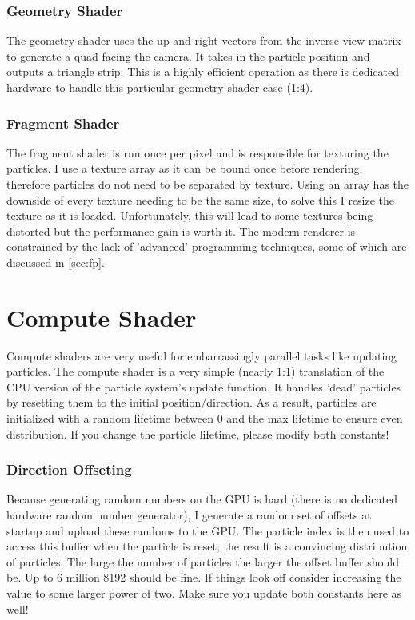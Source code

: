 \documentclass[]{report}
\begin{document}
\subsubsection{Geometry Shader}
The geometry shader uses the up and right vectors from the inverse view matrix to generate a quad facing the camera. It takes in the particle position and outputs a triangle strip. This is a highly efficient operation as there is dedicated hardware to handle this particular geometry shader case (1:4)\cite[p.~9]{amdprogram}. 
\subsubsection{Fragment Shader}
The fragment shader is run once per pixel and is responsible for texturing the particles. I use a texture array as it can be bound once before rendering, therefore particles do not need to be separated by texture. Using an array has the downside of every texture needing to be the same size, to solve this I resize the texture as it is loaded. Unfortunately, this will lead to some textures being distorted but the performance gain is worth it. The modern renderer is constrained by the lack of 'advanced' programming techniques, some of which are discussed in \autoref{sec:fp}.
\section{Compute Shader}
Compute shaders are very useful for embarrassingly parallel tasks like updating particles. The compute shader is a very simple (nearly 1:1) translation of the CPU version of the particle system's update function. It handles 'dead' particles by resetting them to the initial position/direction. As a result, particles are initialized with a random lifetime between 0 and the max lifetime to ensure even distribution. If you change the particle lifetime, please modify both constants! 
\subsubsection{Direction Offseting}
Because generating random numbers on the GPU is hard (there is no dedicated hardware random number generator), I generate a random set of offsets at startup and upload these randoms to the GPU. The particle index is then used to access this buffer when the particle is reset; the result is a convincing distribution of particles. The large the number of particles the larger the offset buffer should be. Up to 6 million 8192 should be fine. If things look off consider increasing the value to some larger power of two. Make sure you update both constants here as well!
\end{document}
